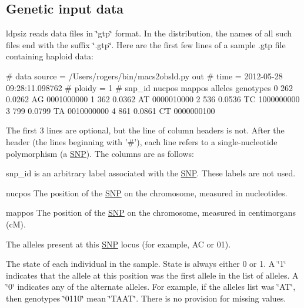 \subsection*{Genetic input data}

{\ttfamily ldpsiz} reads data files in \char`\"{}gtp\char`\"{} format. In the distribution, the names of all such files end with the suffix \char`\"{}.\-gtp\char`\"{}. Here are the first few lines of a sample .gtp file containing haploid data\-: \begin{DoxyVerb}# data source           = /Users/rogers/bin/macs2obsld.py out
# time                  = 2012-05-28 09:28:11.098762
# ploidy                = 1
#   snp_id     nucpos   mappos alleles genotypes
         0        262   0.0262      AG 0001000000
         1        362   0.0362      AT 0000010000
         2        536   0.0536      TC 1000000000
         3        799   0.0799      TA 0010000000
         4        861   0.0861      CT 0000000100
\end{DoxyVerb}


The first 3 lines are optional, but the line of column headers is not. After the header (the lines beginning with '\#'), each line refers to a single-\/nucleotide polymorphism (a \hyperlink{struct_s_n_p}{S\-N\-P}). The columns are as follows\-:


\begin{DoxyEnumerate}
\item snp\-\_\-id is an arbitrary label associated with the \hyperlink{struct_s_n_p}{S\-N\-P}. These labels are not used.
\item nucpos The position of the \hyperlink{struct_s_n_p}{S\-N\-P} on the chromosome, measured in nucleotides.
\item mappos The position of the \hyperlink{struct_s_n_p}{S\-N\-P} on the chromosome, measured in centimorgans (c\-M).
\item The alleles present at this \hyperlink{struct_s_n_p}{S\-N\-P} locus (for example, A\-C or 01).
\item The state of each individual in the sample. State is always either 0 or 1. A \char`\"{}1\char`\"{} indicates that the allele at this position was the first allele in the list of alleles. A \char`\"{}0\char`\"{} indicates any of the alternate alleles. For example, if the alleles list was \char`\"{}\-A\-T\char`\"{}, then genotypes \char`\"{}0110\char`\"{} mean \char`\"{}\-T\-A\-A\-T\char`\"{}. There is no provision for missing values.
\end{DoxyEnumerate}


